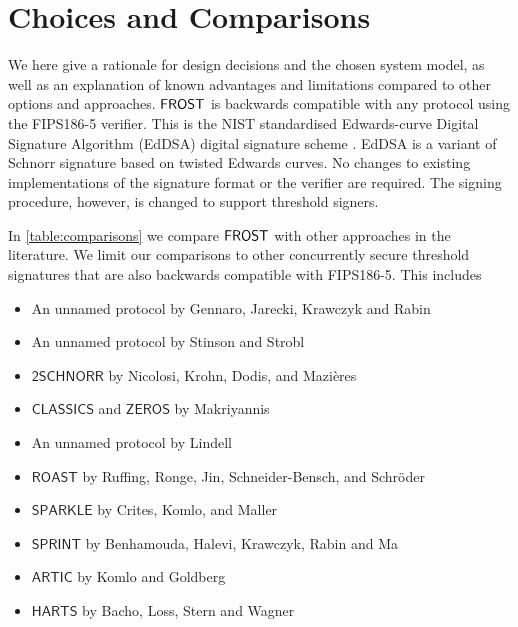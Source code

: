 
\section{Choices and Comparisons}\label{section:comparisons}

We here give a rationale for design decisions and the chosen system model, as well as an explanation of known advantages and limitations compared to other options and approaches.
$\mathsf{FROST}$ is backwards compatible with any protocol using the FIPS186-5 verifier. 
This is the NIST standardised Edwards-curve Digital Signature Algorithm (EdDSA) digital signature scheme \cite{EdDSA}.
EdDSA is a variant of Schnorr signature based on twisted Edwards curves.
No changes to existing implementations of the signature format or the verifier are required.
The signing procedure, however, is changed to support threshold signers.

In \cref{table:comparisons} we compare $\mathsf{FROST}$ with other approaches in the literature.
We limit our comparisons to other concurrently secure threshold signatures that are also backwards compatible with FIPS186-5.
This includes
\begin{itemize}
	\item An unnamed protocol by Gennaro, Jarecki, Krawczyk and Rabin \cite{GennaroJKR01}
	\item An unnamed protocol by Stinson and Strobl \cite{StinsonS01}
	\item $\mathsf{2SCHNORR}$ by Nicolosi, Krohn, Dodis, and Mazi\`eres \cite{NicolosiKDM03}
	\item $\mathsf{CLASSICS}$ and $\mathsf{ZEROS}$ by Makriyannis \cite{Makriyannis22}	
	\item An unnamed protocol by Lindell \cite{Lindell22}
	\item $\mathsf{ROAST}$ by Ruffing, Ronge, Jin, Schneider{-}Bensch, and Schr{\"{o}}der \cite{RuffingRJSS22}
	\item $\mathsf{SPARKLE}$ by Crites, Komlo, and Maller \cite{CritesKM23}
	\item $\mathsf{SPRINT}$ by Benhamouda, Halevi, Krawczyk, Rabin and Ma \cite{BenhamoudaHKRM23}
	\item $\mathsf{ARTIC}$ by Komlo and Goldberg \cite{KomloG24}
	\item $\mathsf{HARTS}$ by Bacho, Loss, Stern and Wagner \cite{BachoLSW24}
\end{itemize}

